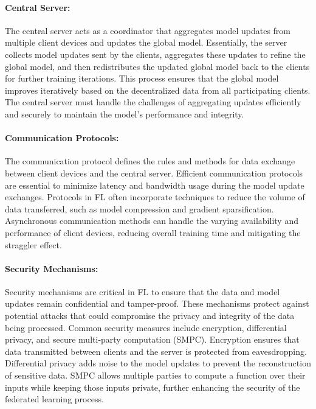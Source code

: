 \paragraph{Central Server:} The central server acts as a coordinator that aggregates model updates from multiple
client devices and updates the global model. Essentially, the server collects model updates sent by the clients, aggregates
these updates to refine the global model, and then redistributes the updated global model back to the clients for further
training iterations. This process ensures that the global model improves iteratively based on the decentralized data from
all participating clients. The central server must handle the challenges of aggregating updates efficiently and securely
to maintain the model's performance and integrity.

\paragraph{Communication Protocols:}\label{par:communication} The communication protocol defines the rules and methods for data exchange between
client devices and the central server. Efficient communication protocols are essential to minimize latency and bandwidth
usage during the model update exchanges. Protocols in FL often incorporate techniques to reduce the volume of data transferred,
such as model compression and gradient sparsification. Asynchronous communication methods can handle the varying availability and
performance of client devices, reducing overall training time and mitigating the straggler effect.

\paragraph{Security Mechanisms:}\label{par:security} Security mechanisms are critical in FL to ensure that the data and model updates remain confidential and tamper-proof.
These mechanisms protect against potential attacks that could compromise the privacy and integrity of the data being processed.
Common security measures include encryption, differential privacy, and secure multi-party computation (SMPC). Encryption ensures that data
transmitted between clients and the server is protected from eavesdropping. Differential privacy adds noise to the model updates to prevent the
reconstruction of sensitive data. SMPC allows multiple parties to compute a function over their inputs while keeping those inputs private, further
enhancing the security of the federated learning process.

